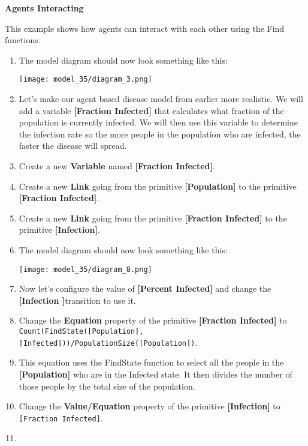 \documentclass[]{memoir}
\makeatletter
\def\maxwidth{\ifdim\Gin@nat@width>\linewidth\linewidth
\else\Gin@nat@width\fi}
\let\Oldincludegraphics\includegraphics
\renewcommand{\includegraphics}[1]{\Oldincludegraphics[width=\maxwidth]{#1}}
\newcommand{\p}[1]{\textbf{{[}#1{]}}}
\newcommand{\e}[1]{\texttt{#1}}
\renewcommand{\a}[1]{\textbf{#1}}
\makeatother
\begin{document}
\begin{oframed}\textbf{Agents Interacting} 

 This example shows how agents can interact with each other using the Find functions.

\begin{enumerate}
\item The model diagram should now look something like this: \par \begin{minipage}{\linewidth}  \centering \texttt{[image: model\_35/diagram\_3.png]}
\end{minipage}
\item 

Let’s make our agent based disease model from earlier more realistic. We will add a variable \p{Fraction Infected} that calculates what fraction of the population is currently infected. We will then use this variable to determine the infection rate so the more people in the population who are infected, the faster the disease will spread.


\item Create a new \a{Variable} named \p{Fraction Infected}.
\item Create a new \a{Link} going from the primitive \p{Population} to the primitive \p{Fraction Infected}.
\item Create a new \a{Link} going from the primitive \p{Fraction Infected} to the primitive \p{Infection}.
\item The model diagram should now look something like this: \par \begin{minipage}{\linewidth}  \centering \texttt{[image: model\_35/diagram\_8.png]}
\end{minipage}
\item 

Now let's configure the value of \p{Percent Infected} and change the \p{Infection }transition to use it.


\item  Change the \a{Equation} property of the primitive \p{Fraction Infected} to \e{Count(FindState([Population], [Infected]))/PopulationSize([Population])}.
\item 

This equation uses the FindState function to select all the people in the \p{Population} who are in the Infected state. It then divides the number of those people by the total size of the population.


\item  Change the \a{Value/Equation} property of the primitive \p{Infection} to \e{[Fraction Infected]}.
\item 


\end{enumerate}
\end{oframed}
\end{document}
